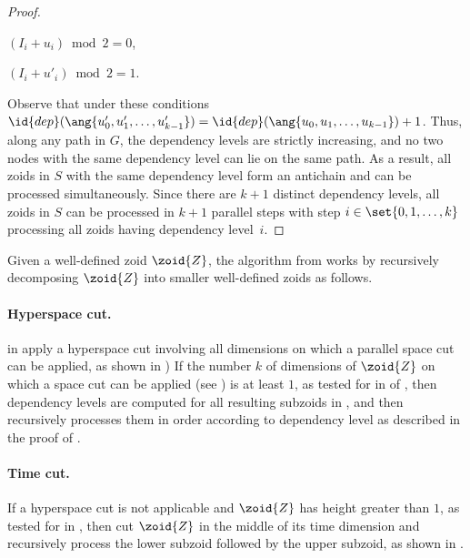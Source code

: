 \begin{proof}
\begin{closeitemize}
\item $(I_i+u_i) \bmod 2 = 0$,

\item $(I_i+u'_i) \bmod 2 = 1$. 

\end{closeitemize}
Observe that under these conditions $\id{dep}(\ang{ u'_0, u'_1,
  \ldots, u'_{k - 1}}) = \id{dep}(\ang{ u_0, u_1, \ldots, u_{k - 1}})
+ 1$. Thus, along any path in $G$, the dependency levels are strictly
increasing, and no two nodes with the same dependency level can lie on
the same path.  As a result, all zoids in $S$ with the same dependency
level form an antichain and can be processed simultaneously.  Since
there are $k + 1$ distinct dependency levels, all zoids in $S$ can be
processed in $k + 1$ parallel steps with step $i\in\set{0,1,\ldots,k}$
processing all zoids having dependency level~$i$.
\end{proof}


Given a well-defined zoid $\zoid{Z}$, the algorithm  from
 works by recursively decomposing $\zoid{Z}$ into
smaller well-defined zoids as follows.

\paragraph{Hyperspace cut.}
 in  apply a hyperspace cut
involving all dimensions on which a parallel space cut can be applied,
as shown in ) If the
number $k$ of dimensions of $\zoid{Z}$ on which a space cut can be
applied (see ) is at
least $1$, as tested for in  of , then
dependency levels are computed for all resulting subzoids in
, and then 
recursively processes them in order according to dependency level as
described in the proof of .

\paragraph{Time cut.}
If a hyperspace cut is not applicable and $\zoid{Z}$ has height greater
than $1$, as tested for in , then
 cut $\zoid{Z}$ in the middle of
its time dimension and recursively process the lower subzoid followed
by the upper subzoid, as shown in .

